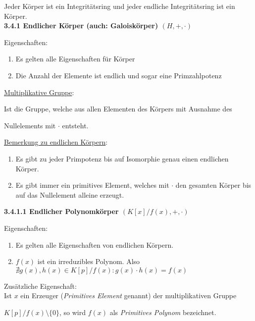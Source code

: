 \documentclass[18pt] {article}
\begin{document}
Jeder Körper ist ein Integritätsring und jeder endliche Integritätsring ist ein Körper.\\

\textbf{3.4.1 Endlicher Körper (auch: Galoiskörper) $(H, +, \cdot)$}
\begin{framed}
Eigenschaften: \\

\begin{enumerate}

\item Es gelten alle Eigenschaften für Körper

\item Die Anzahl der Elemente ist endlich und sogar eine Primzahlpotenz
\end{enumerate}
\end{framed}
\bigskip
\underline{Multiplikative Gruppe}:

Ist die Gruppe, welche aus allen Elementen des Körpers mit Ausnahme des 

Nullelements mit $\cdot$ entsteht.\\
\bigskip

\underline{Bemerkung zu endlichen Körpern}:
\begin{enumerate}
\item Es gibt zu jeder Primpotenz bis auf Isomorphie genau einen endlichen Körper.

\item Es gibt immer ein primitives Element, welches mit $\cdot$ den gesamten Körper bis auf das Nullelement alleine erzeugt.

\end{enumerate}
\pagebreak
\textbf{3.4.1.1 Endlicher Polynomkörper  $(K[x]/f(x), +, \cdot)$}
\begin{framed}
Eigenschaften: \\
\begin{enumerate}
\item Es gelten alle Eigenschaften von endlichen Körpern.

\item $f(x)$ ist ein irreduzibles Polynom. Also $\nexists g(x), h(x) \in K[p]/f(x): g(x) \cdot h(x) = f(x)$\\

\end{enumerate}

Zusätzliche Eigenschaft:\\

Ist $x$ ein Erzeuger (\textit{Primitives Element} genannt) der multiplikativen Gruppe

$K[p]/f(x)\setminus\{0\}$, so wird $f(x)$ als \textit{Primitives Polynom} bezeichnet.
\end{framed}
\end{document}
